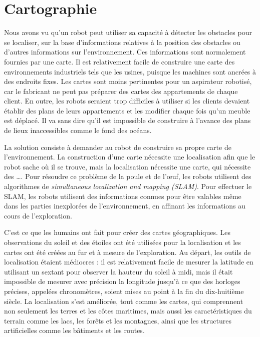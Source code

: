 
\chapter{Cartographie}\label{ch.mapping}

Nous avons vu qu'un robot peut utiliser sa capacité à détecter les obstacles pour se localiser, sur la base d'informations relatives à la position des obstacles ou d'autres informations sur l'environnement. Ces informations sont normalement fournies par une carte. Il est relativement facile de construire une carte des environnements industriels tels que les usines, puisque les machines sont ancrées à des endroits fixes. Les cartes sont moins pertinentes pour un aspirateur robotisé, car le fabricant ne peut pas préparer des cartes des appartements de chaque client. En outre, les robots seraient trop difficiles à utiliser si les clients devaient établir des plans de leurs appartements et les modifier chaque fois qu'un meuble est déplacé. Il va sans dire qu'il est impossible de construire à l'avance des plans de lieux inaccessibles comme le fond des océans.

La solution consiste à demander au robot de construire sa propre carte de l'environnement. La construction d'une carte nécessite une localisation afin que le robot sache où il se trouve, mais la localisation nécessite une carte, qui nécessite des \ldots. Pour résoudre ce problème de la poule et de l'œuf, les robots utilisent des algorithmes de \emph{simultaneous localization and mapping (SLAM)}. Pour effectuer le SLAM, les robots utilisent des informations connues pour être valables même dans les parties inexplorées de l'environnement, en affinant les informations au cours de l'exploration.

C'est ce que les humains ont fait pour créer des cartes géographiques. Les observations du soleil et des étoiles ont été utilisées pour la localisation et les cartes ont été créées au fur et à mesure de l'exploration. Au départ, les outils de localisation étaient médiocres : il est relativement facile de mesurer la latitude en utilisant un sextant pour observer la hauteur du soleil à midi, mais il était impossible de mesurer avec précision la longitude jusqu'à ce que des horloges précises, appelées chronomètres, soient mises au point à la fin du dix-huitième siècle. La localisation s'est améliorée, tout comme les cartes, qui comprennent non seulement les terres et les côtes maritimes, mais aussi les caractéristiques du terrain comme les lacs, les forêts et les montagnes, ainsi que les structures artificielles comme les bâtiments et les routes.


